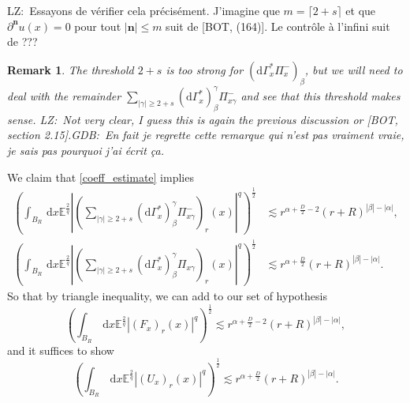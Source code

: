 \documentclass[12pt, a4paper]{article}
\newtheorem{remark}[theorem]{Remark}
\newcommand{\dG}{\mathrm{d}\Gamma^*_x}
\newcommand{\mn}{\mathbf{n}}
\newcommand{\abs}[1]{\left| #1 \right|}
\newcommand{\dd}{\,\mathrm{d}}
\newcommand{\gdb}[1]{\begingroup\color{red}GDB:\ #1\endgroup}
\newcommand{\lz}[1]{\begingroup\color{blue}LZ:\ #1\endgroup}
\begin{document}
\lz{Essayons de vérifier cela précisément. J'imagine que $m=\lceil 2+s \rceil$ et que $\partial^\mn u(x) = 0$ pour tout 
$\abs{\mn} \leq m$ suit de [BOT, (164)]. Le contrôle à l'infini suit de ???   }
\begin{remark}
    The threshold $2+s$ is too strong for $(\dG \Pi_{x}^-)_\beta$, but we will need to deal with the remainder $\sum_{\abs{\gamma} \geq 2+s} (\dG)_\beta^\gamma \Pi_{x\gamma}^-$ and see that this threshold makes sense. \lz{Not very clear, I guess this is again the previous discussion or
    [BOT, section 2.15].}\gdb{En fait je regrette cette remarque qui n'est pas vraiment vraie, je sais pas pourquoi j'ai écrit ça.}
\end{remark}

We claim that \eqref{coeff_estimate} implies 
\begin{align}
    \left(\int_{B_R} \dd x \mathbb{E}^{\frac{2}{q}}\abs{(\sum_{\abs{\gamma}\geq 2+s} (\dG)_\beta^\gamma \Pi_{x\gamma}^-)_r(x)}^q \right)^\frac{1}{2} &\lesssim r^{\alpha + \frac{D}{2}-2}(r+R)^{\abs{\beta} - \abs{\alpha}},\label{remainder_right}\\
    \left(\int_{B_R} \dd x \mathbb{E}^{\frac{2}{q}}\abs{(\sum_{\abs{\gamma}\geq 2+s} (\dG)_\beta^\gamma \Pi_{x\gamma})_r(x)}^q \right)^\frac{1}{2} &\lesssim r^{\alpha + \frac{D}{2}}(r+R)^{\abs{\beta} - \abs{\alpha}}. \label{remainder_left}
\end{align}
So that by triangle inequality, we can add to our set of hypothesis
\begin{equation}
        \label{F_homogeneity}
        \left(\int_{B_R} \dd x \mathbb{E}^{\frac{2}{q}}\abs{(F_x)_r(x)}^q \right)^\frac{1}{2} \lesssim r^{\alpha + \frac{D}{2}-2}(r+R)^{\abs{\beta} - \abs{\alpha}},
\end{equation}
and it suffices to show
\begin{equation*}
        \left(\int_{B_R} \dd x \mathbb{E}^{\frac{2}{q}}\abs{(U_x)_r(x)}^q \right)^\frac{1}{2} \lesssim r^{\alpha + \frac{D}{2}}(r+R)^{\abs{\beta} - \abs{\alpha}}.
\end{equation*}
\end{document}
